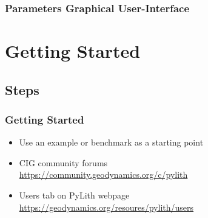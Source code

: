 \documentclass[aspectratio=169]{beamer}
\begin{document}
\begin{frame}
  \frametitle{Parameters Graphical User-Interface}


\end{frame}

\section{Getting Started}
\subsection{Steps}

\begin{frame}
  \frametitle{Getting Started}
  \summary{}

  \begin{itemize}
   \url{https://pylith.readthedocs.io}
  \item Use an example or benchmark as a starting point
  \item CIG community forums\\
    \url{https://community.geodynamics.org/c/pylith}
  \item Users tab on PyLith webpage\\
    \url{https://geodynamics.org/resoures/pylith/users}
  \end{itemize}

\end{frame}
\end{document}
